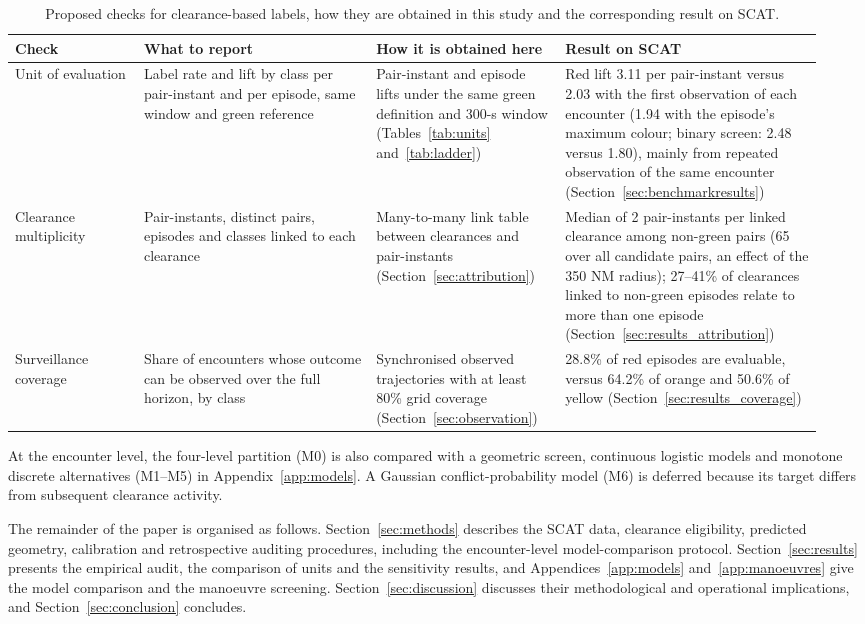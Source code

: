 \documentclass[aerospace,article,submit,moreauthors]{Definitions/mdpi}
\begin{document}
\begin{table}[t]
\caption{Proposed checks for clearance-based labels, how they are obtained in this study and the corresponding result on SCAT.}\label{tab:checks}
\small
\begin{tabular}{@{}p{0.15\linewidth}p{0.27\linewidth}p{0.22\linewidth}p{0.30\linewidth}@{}}
\toprule
Check & What to report & How it is obtained here & Result on SCAT\\
\midrule
Unit of evaluation & Label rate and lift by class per pair-instant and per episode, same window and green reference & Pair-instant and episode lifts under the same green definition and 300-s window (Tables~\ref{tab:units} and~\ref{tab:ladder}) & Red lift 3.11 per pair-instant versus 2.03 with the first observation of each encounter (1.94 with the episode's maximum colour; binary screen: 2.48 versus 1.80), mainly from repeated observation of the same encounter (Section~\ref{sec:benchmarkresults})\\
Clearance multiplicity & Pair-instants, distinct pairs, episodes and classes linked to each clearance & Many-to-many link table between clearances and pair-instants (Section~\ref{sec:attribution}) & Median of 2 pair-instants per linked clearance among non-green pairs (65 over all candidate pairs, an effect of the 350 NM radius); 27--41\% of clearances linked to non-green episodes relate to more than one episode (Section~\ref{sec:results_attribution})\\
Surveillance coverage & Share of encounters whose outcome can be observed over the full horizon, by class & Synchronised observed trajectories with at least 80\% grid coverage (Section~\ref{sec:observation}) & 28.8\% of red episodes are evaluable, versus 64.2\% of orange and 50.6\% of yellow (Section~\ref{sec:results_coverage})\\
\bottomrule
\end{tabular}
\end{table}

At the encounter level, the four-level partition (M0) is also compared with a geometric screen, continuous logistic models and monotone discrete alternatives (M1--M5) in Appendix~\ref{app:models}. A Gaussian conflict-probability model (M6) is deferred because its target differs from subsequent clearance activity.

The remainder of the paper is organised as follows. Section~\ref{sec:methods} describes the SCAT data, clearance eligibility, predicted geometry, calibration and retrospective auditing procedures, including the encounter-level model-comparison protocol. Section~\ref{sec:results} presents the empirical audit, the comparison of units and the sensitivity results, and Appendices~\ref{app:models} and~\ref{app:manoeuvres} give the model comparison and the manoeuvre screening. Section~\ref{sec:discussion} discusses their methodological and operational implications, and Section~\ref{sec:conclusion} concludes.
\end{document}
